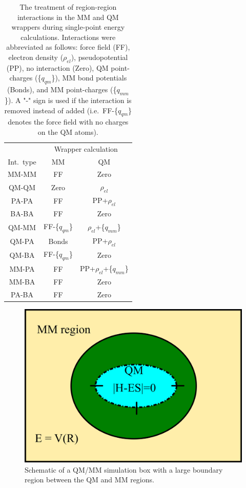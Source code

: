 \documentclass[12pt]{report}
\begin{document}
\begin{table}[hbt]
 \centering
 \begin{tabular}{|c|c c|}
 \hline
  & \multicolumn{2}{|c|}{Wrapper calculation} \\
 Int.\ type & MM & QM \\ \hline
 MM-MM & FF & Zero \\
 QM-QM & Zero & $\rho_{el}$ \\
 PA-PA & FF & PP+$\rho_{el}$ \\
 BA-BA & FF & Zero \\
 QM-MM & FF-\{$q_{qm}$\} & $\rho_{el}$+\{$q_{mm}$\} \\
 QM-PA & Bonds & PP+$\rho_{el}$ \\
 QM-BA & FF-\{$q_{qm}$\} & Zero \\
 MM-PA & FF & PP+$\rho_{el}$+\{$q_{mm}$\} \\
 MM-BA & FF & Zero \\
 PA-BA & FF & Zero \\ \hline
 \end{tabular}
 \caption{
 The treatment of region-region interactions in the MM and QM
 wrappers during single-point energy calculations.
 Interactions were abbreviated as follows: force field (FF), electron density
 ($\rho_{el}$), pseudopotential (PP), no interaction (Zero), QM point-charges
 (\{$q_{qm}$\}), MM bond potentials (Bonds), and MM point-charges
 (\{$q_{mm}$\}).
 A "-" sign is used if the interaction is removed instead of added
 (i.e.\ FF-\{$q_{qm}$\} denotes the force field with no charges on the
 QM atoms).}
 \label{tab:IntTable}
\end{table}

\begin{figure}[hbt]
 \centering
 \includegraphics[scale=0.50]{../doc/images/QMMM_3.png}
 \caption{
 Schematic of a QM/MM simulation box with a large boundary region
 between the QM and MM regions.}
 \label{fig:QMMM3}
\end{figure}
\end{document}
